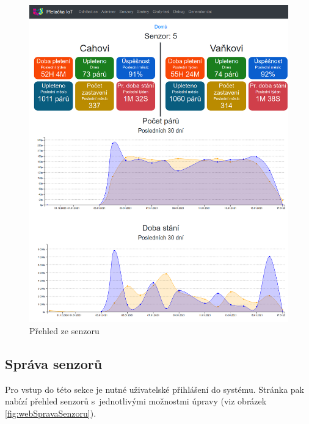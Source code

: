 \begin{figure}[htbp]
    \centering
    \includegraphics[width=\textwidth]{img/prehled.png}
    \caption{Přehled ze senzoru}
    \label{fig:webSenzory}
\end{figure}




\subsection{Správa senzorů}
Pro vstup do této sekce je nutné uživatelské přihlášení do systému.
Stránka pak nabízí přehled senzorů s~jednotlivými možnostmi úpravy (viz obrázek \ref{fig:webSpravaSenzoru}).


